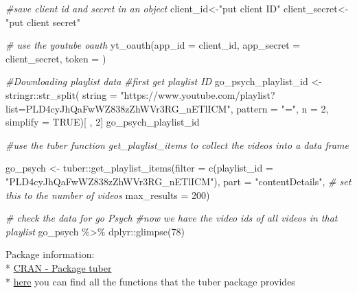\documentclass[
]{book}
\newenvironment{Shaded}{\begin{snugshade}}{\end{snugshade}}
\newcommand{\AttributeTok}[1]{\textcolor[rgb]{0.77,0.63,0.00}{#1}}
\newcommand{\CommentTok}[1]{\textcolor[rgb]{0.56,0.35,0.01}{\textit{#1}}}
\newcommand{\ConstantTok}[1]{\textcolor[rgb]{0.00,0.00,0.00}{#1}}
\newcommand{\DecValTok}[1]{\textcolor[rgb]{0.00,0.00,0.81}{#1}}
\newcommand{\FunctionTok}[1]{\textcolor[rgb]{0.00,0.00,0.00}{#1}}
\newcommand{\NormalTok}[1]{#1}
\newcommand{\OtherTok}[1]{\textcolor[rgb]{0.56,0.35,0.01}{#1}}
\newcommand{\SpecialCharTok}[1]{\textcolor[rgb]{0.00,0.00,0.00}{#1}}
\newcommand{\StringTok}[1]{\textcolor[rgb]{0.31,0.60,0.02}{#1}}
\begin{document}
\begin{Shaded}
\begin{Highlighting}[]
\CommentTok{\#save client id and secret in an object}
\NormalTok{client\_id}\OtherTok{\textless{}{-}}\StringTok{"put client ID"}
\NormalTok{client\_secret}\OtherTok{\textless{}{-}}\StringTok{"put client secret"}

\CommentTok{\# use the youtube oauth }
\FunctionTok{yt\_oauth}\NormalTok{(}\AttributeTok{app\_id =}\NormalTok{ client\_id,}
         \AttributeTok{app\_secret =}\NormalTok{ client\_secret,}
         \AttributeTok{token =} \StringTok{\textquotesingle{}\textquotesingle{}}\NormalTok{)}

\CommentTok{\#Downloading playlist data}
\CommentTok{\#first get playlist ID}
\NormalTok{go\_psych\_playlist\_id }\OtherTok{\textless{}{-}}\NormalTok{ stringr}\SpecialCharTok{::}\FunctionTok{str\_split}\NormalTok{(}
  \AttributeTok{string =} \StringTok{"https://www.youtube.com/playlist?list=PLD4cyJhQaFwWZ838zZhWVr3RG\_nETlICM"}\NormalTok{, }
  \AttributeTok{pattern =} \StringTok{"="}\NormalTok{, }
  \AttributeTok{n =} \DecValTok{2}\NormalTok{,}
  \AttributeTok{simplify =} \ConstantTok{TRUE}\NormalTok{)[ , }\DecValTok{2}\NormalTok{]}
\NormalTok{go\_psych\_playlist\_id}

\CommentTok{\#use the tuber function get\_playlist\_items to collect the videos into a data frame}

\NormalTok{go\_psych }\OtherTok{\textless{}{-}}\NormalTok{ tuber}\SpecialCharTok{::}\FunctionTok{get\_playlist\_items}\NormalTok{(}\AttributeTok{filter =} 
                                                \FunctionTok{c}\NormalTok{(}\AttributeTok{playlist\_id =} \StringTok{"PLD4cyJhQaFwWZ838zZhWVr3RG\_nETlICM"}\NormalTok{), }
                                              \AttributeTok{part =} \StringTok{"contentDetails"}\NormalTok{,}
                                              \CommentTok{\# set this to the number of videos}
                                              \AttributeTok{max\_results =} \DecValTok{200}\NormalTok{) }

\CommentTok{\# check the data for go Psych}
\CommentTok{\#now we have the video ids of all videos in that playlist}
\NormalTok{go\_psych }\SpecialCharTok{\%\textgreater{}\%}\NormalTok{ dplyr}\SpecialCharTok{::}\FunctionTok{glimpse}\NormalTok{(}\DecValTok{78}\NormalTok{)}
\end{Highlighting}
\end{Shaded}

Package information:\\
* \href{https://cran.r-project.org/web/packages/tuber/index.html}{CRAN - Package tuber}\\
* \href{https://cran.r-project.org/web/packages/tuber/tuber.pdf}{here} you can find all the functions that the tuber package provides
\end{document}
